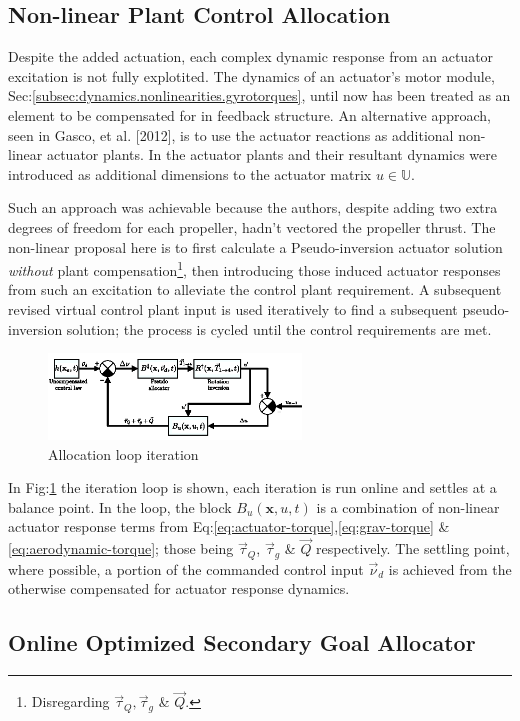 \subsection{Non-linear Plant Control Allocation}
\label{subsec:control.allocation.nonlinear}
Despite the added actuation, each complex dynamic response from an actuator excitation is not fully explotited. The dynamics of an actuator's motor module, Sec:\ref{subsec:dynamics.nonlinearities.gyrotorques}, until now has been treated as an element to be compensated for in feedback structure. An alternative approach, seen in Gasco, et al. [2012]\cite{tiltgasco,tiltrihani}, is to use the actuator reactions as additional non-linear actuator plants. In \cite{tiltgasco,tiltrihani} the actuator plants and their resultant dynamics were introduced as additional dimensions to the actuator matrix $u\in\mathbb{U}$. 
\par
Such an approach was achievable because the authors, despite adding two extra degrees of freedom for each propeller, hadn't vectored the propeller thrust. The non-linear proposal here is to first calculate a Pseudo-inversion actuator solution \emph{without} plant compensation\footnote{Disregarding $\vec{\tau}_Q,\vec{\tau}_g$ \& $\vec{Q}$.}, then introducing those induced actuator responses from such an excitation to alleviate the control plant requirement. A subsequent revised virtual control plant input is used iteratively to find a subsequent pseudo-inversion solution; the process is cycled until the control requirements are met.
\par
\begin{figure}[hbtp]
\centering
\includegraphics[width=0.6\textwidth]{figs/allocation}
\caption{Allocation loop iteration}
\label{fig:non-linear-allocation}
\end{figure}
In Fig:\ref{fig:non-linear-allocation} the iteration loop is shown, each iteration is run online and settles at a balance point. In the loop, the block $B_u(\mathbf{x},u,t)$ is a combination of non-linear actuator response terms from Eq:\ref{eq:actuator-torque},\ref{eq:grav-torque} \& \ref{eq:aerodynamic-torque}; those being $\vec{\tau}_Q$, $\vec{\tau}_g$ \& $\vec{Q}$ respectively. The settling point, where possible, a portion of the commanded control input $\vec{\nu}_d$ is achieved from the otherwise compensated for actuator response dynamics.

\subsection{Online Optimized Secondary Goal Allocator}
\label{subsec:control.allocation.online}
